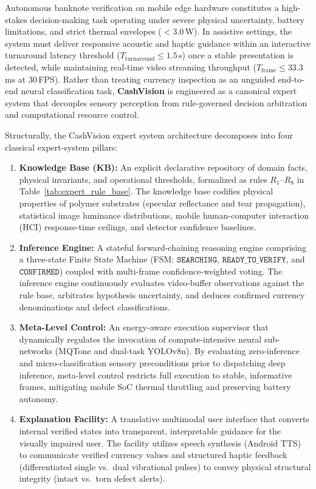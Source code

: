 \documentclass[final,5p,times,twocolumn,authoryear]{elsarticle}
\begin{document}
Autonomous banknote verification on mobile edge hardware constitutes a high-stakes decision-making task operating under severe physical uncertainty, battery limitations, and strict thermal envelopes ($<3.0$\,W). In assistive settings, the system must deliver responsive acoustic and haptic guidance within an interactive turnaround latency threshold ($T_{\text{turnaround}} \le 1.5$\,s) \cite{Nielsen1993,Miller1968} once a stable presentation is detected, while maintaining real-time video streaming throughput ($T_{\text{frame}} \le 33.3$\,ms at $30$\,FPS). Rather than treating currency inspection as an unguided end-to-end neural classification task, \textbf{CashVision} is engineered as a canonical expert system that decouples sensory perception from rule-governed decision arbitration and computational resource control.

Structurally, the CashVision expert system architecture decomposes into four classical expert-system pillars:
\begin{enumerate}[label=(\roman*)]
    \item \textbf{Knowledge Base (KB):} An explicit declarative repository of domain facts, physical invariants, and operational thresholds, formalized as rules $R_1$--$R_8$ in Table~\ref{tab:expert_rule_base}. The knowledge base codifies physical properties of polymer substrates (specular reflectance and tear propagation), statistical image luminance distributions, mobile human-computer interaction (HCI) response-time ceilings, and detector confidence baselines.
    \item \textbf{Inference Engine:} A stateful forward-chaining reasoning engine comprising a three-state Finite State Machine (FSM: $\texttt{SEARCHING}$, $\texttt{READY\_TO\_VERIFY}$, and $\texttt{CONFIRMED}$) coupled with multi-frame confidence-weighted voting. The inference engine continuously evaluates video-buffer observations against the rule base, arbitrates hypothesis uncertainty, and deduces confirmed currency denominations and defect classifications.
    \item \textbf{Meta-Level Control:} An energy-aware execution supervisor that dynamically regulates the invocation of compute-intensive neural sub-networks (MQTone and dual-task YOLOv8n). By evaluating zero-inference and micro-classification sensory preconditions prior to dispatching deep inference, meta-level control restricts full execution to stable, informative frames, mitigating mobile SoC thermal throttling and preserving battery autonomy.
    \item \textbf{Explanation Facility:} A translative multimodal user interface that converts internal verified states into transparent, interpretable guidance for the visually impaired user. The facility utilizes speech synthesis (Android TTS) to communicate verified currency values and structured haptic feedback (differentiated single vs.\ dual vibrational pulses) to convey physical structural integrity (intact vs.\ torn defect alerts).
\end{enumerate}
\end{document}
